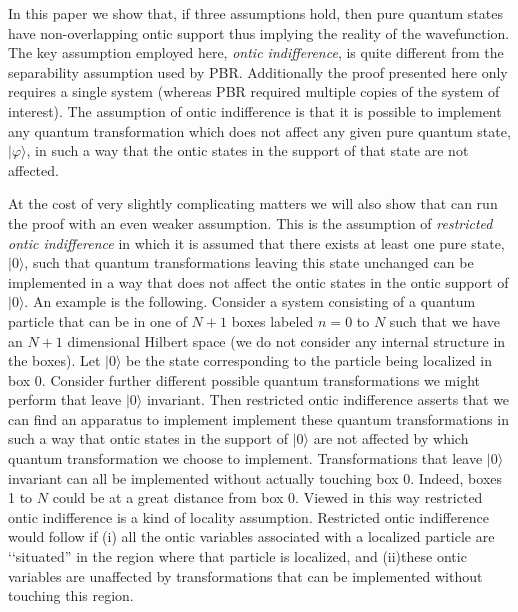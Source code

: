 \documentclass[12pt]{article}
\begin{document}
In this paper we show that, if three assumptions hold, then pure quantum states have non-overlapping ontic support thus implying the reality of the wavefunction.   The key assumption employed here,
\emph{ontic indifference}, is quite different from the separability assumption used by PBR.  Additionally the proof presented here only requires a single system (whereas PBR required
multiple copies of the system of interest).  The assumption of ontic indifference is that it is possible to implement any quantum transformation which does not affect any given pure quantum
state, $|\varphi\rangle$, in such a way that the ontic states in the support of that state are not affected.

At the cost of very slightly complicating matters we will also show that can run the proof with an even weaker assumption.  This is the assumption of \emph{restricted ontic indifference} in
which it is assumed that there exists at least one pure state, $|0\rangle$, such that quantum transformations leaving this state unchanged can be implemented in a way that does not affect
the ontic states in the ontic support of $|0\rangle$.  An example is the following. Consider a system consisting of a quantum particle that can be in one of $N+1$ boxes labeled $n=0$ to $N$
such that we have an $N+1$ dimensional Hilbert space (we do not consider any internal structure in the boxes).  Let $|0\rangle$ be the state corresponding to the particle being localized in
box 0.  Consider further different possible quantum transformations we might perform that leave $|0\rangle$ invariant.  Then restricted ontic indifference asserts that we can find an
apparatus to implement implement these quantum transformations in such a way that ontic states in the support of $|0\rangle$ are not affected by which quantum transformation we choose to
implement.  Transformations that leave $|0\rangle$ invariant can all be implemented without actually touching box 0.  Indeed, boxes 1 to $N$ could be at a great distance from box 0.  Viewed
in this way restricted ontic indifference is a kind of locality assumption.  Restricted ontic indifference would follow if (i) all the ontic variables associated with a localized particle are \lq\lq situated'' in the region where that particle is localized, and (ii)these ontic variables are unaffected by transformations that can be implemented without touching this region.
\end{document}
